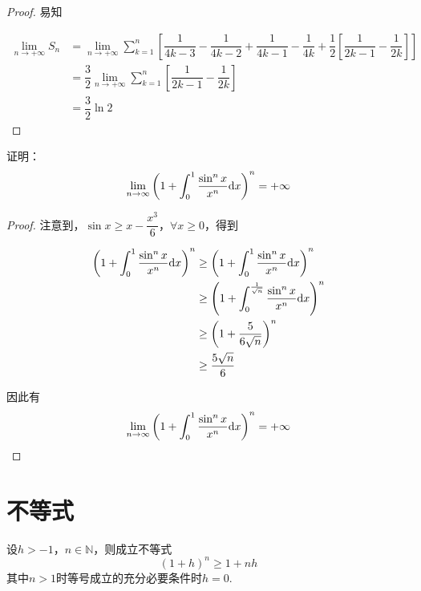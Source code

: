 \begin{proof}

    易知
    
    \begin{align*}
        \lim\limits_{n \to +\infty } S_{n} & =  \lim\limits_{n \to +\infty} \sum\limits_{k = 1}^{n} \left[ \dfrac{1}{4k-3} - \dfrac{1}{4k - 2} + \dfrac{1}{4k - 1} - \dfrac{1}{4k}  + \dfrac{1}{2} \left[ \dfrac{1}{2k - 1} - \dfrac{1}{2k} \right] \right] \\
        & = \dfrac{3}{2} \lim\limits_{n \to + \infty} \sum\limits_{k = 1}^{n}  \left[  \dfrac{1}{2k - 1} -\dfrac{1}{2k} \right] \\
        & = \dfrac{3}{2} \ln 2
    \end{align*}

\end{proof}

\begin{proposition}

    证明：
    $$\lim\limits_{n \to \infty}{\left( 1 + \int_{0}^{1}{\dfrac{\sin^n{x}}{x^n}}\mathrm{d} x \right)^n} = + \infty$$

\end{proposition}

\begin{proof}

    注意到，$\sin{x} \geq x - \dfrac{x^3}{6}$，$\forall x \geq 0$，得到

    \begin{align*}
        \left( 1 + \int_{0}^{1}{\dfrac{\sin^n{x}}{x^n}}\mathrm{d} x \right)^n & \geq \left( 1 + \int_{0}^{1}{\dfrac{\sin^n x}{x^n}}\mathrm{d} x \right)^n \\
        & \geq \left( 1 + \int_{0}^{\frac{1}{\sqrt{n}}}{\dfrac{\sin^n{x}}{x^n}}\mathrm{d} x \right)^n \\
        & \geq \left( 1 + \dfrac{5}{6\sqrt{n}} \right)^n \\
        & \geq \dfrac{5\sqrt{n}}{6}
    \end{align*}

    因此有
    $$\lim\limits_{n \to \infty}{\left( 1 + \int_{0}^{1}{\dfrac{\sin^n{x}}{x^n}}\mathrm{d} x \right)^n} = + \infty$$

\end{proof}

\section{不等式}

\begin{theorem}[Bernoulli不等式]

    设$h > -1$，$n \in \mathbb{N}$，则成立不等式
    $$(1 + h)^n \geq 1 + nh$$
    其中$n > 1$时等号成立的充分必要条件时$h = 0$.

\end{theorem}

